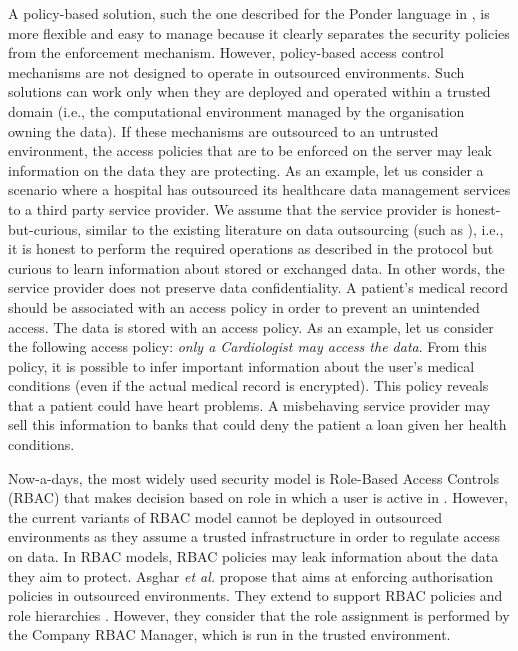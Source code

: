 \documentclass[final,5p,times,twocolumn]{elsarticle}
\begin{document}
A policy-based solution, such the one described for the Ponder language in \cite{Russello2007}, is more flexible and easy to manage because it clearly separates the security policies from the enforcement mechanism. However, policy-based access control mechanisms are not designed to operate in outsourced environments. Such solutions can work only when they are deployed and operated within a trusted domain (i.e., the computational environment managed by the organisation owning the data). If these mechanisms are outsourced to an untrusted environment, the access policies that are to be enforced on the server may leak information on the data they are protecting. As an example, let us consider a scenario where a hospital has outsourced its healthcare data management services to a third party service provider. We assume that the service provider is honest-but-curious, similar to the existing literature on data outsourcing (such as \cite{Vimercati2007}), i.e., it is honest to perform the required operations as described in the protocol but curious to learn information about stored or exchanged data. In other words, the service provider does not preserve data confidentiality. A patient's medical record should be associated with an access policy in order to prevent an unintended access. The data is stored with an access policy. As an example, let us consider the following access policy: \emph{only a Cardiologist may access the data}. From this policy, it is possible to infer important information about the user's medical conditions (even if the actual medical record is encrypted). This policy reveals that a patient could have heart problems. A misbehaving service provider may sell this information to banks that could deny the patient a loan given her health conditions.

Now-a-days, the most widely used security model is Role-Based Access Controls (RBAC) \cite{Sandhu1996} that makes decision based on role in which a user is active in \cite{Connor2010}. However, the current variants of RBAC model cannot be deployed in outsourced environments as they assume a trusted infrastructure in order to regulate access on data. In RBAC models, RBAC policies may leak information about the data they aim to protect. Asghar \emph{et al.} \cite{Asghar2011ARES} propose  that aims at enforcing authorisation policies in outsourced environments. They extend  \cite{Asghar2011ARES} to support RBAC policies and role hierarchies \cite{Asghar2011CCS}. However, they consider that the role assignment is performed by the Company RBAC Manager, which is run in the trusted environment.
\end{document}

